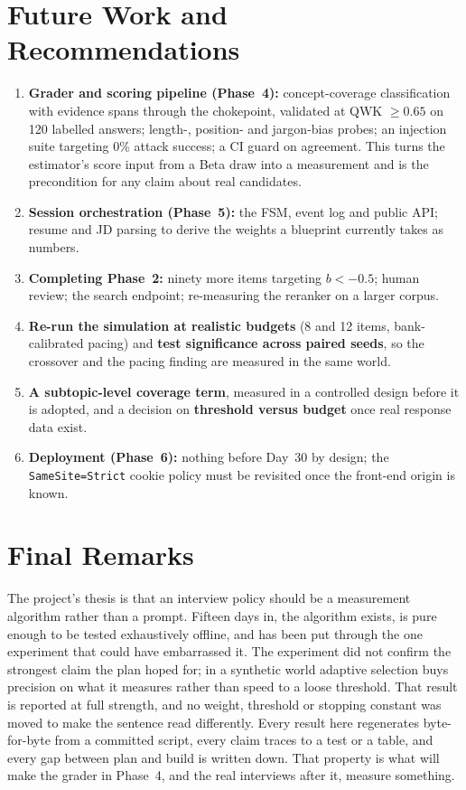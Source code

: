 \documentclass{tietreport}
\begin{document}
\section{Future Work and Recommendations}
\label{sec:future}

\begin{enumerate}
  \item \textbf{Grader and scoring pipeline (Phase~4):} concept-coverage classification with
    evidence spans through the chokepoint, validated at QWK $\ge0.65$ on 120 labelled answers;
    length-, position- and jargon-bias probes; an injection suite targeting 0\% attack success;
    a CI guard on agreement. This turns the estimator's score input from a Beta draw into a
    measurement and is the precondition for any claim about real candidates.
  \item \textbf{Session orchestration (Phase~5):} the FSM, event log and public API; resume and
    JD parsing to derive the weights a blueprint currently takes as numbers.
  \item \textbf{Completing Phase~2:} ninety more items targeting $b<-0.5$; human review; the
    search endpoint; re-measuring the reranker on a larger corpus.
  \item \textbf{Re-run the simulation at realistic budgets} (8 and 12 items, bank-calibrated
    pacing) and \textbf{test significance across paired seeds}, so the crossover and the pacing
    finding are measured in the same world.
  \item \textbf{A subtopic-level coverage term}, measured in a controlled design before it is
    adopted, and a decision on \textbf{threshold versus budget} once real response data exist.
  \item \textbf{Deployment (Phase~6):} nothing before Day~30 by design; the
    \texttt{SameSite=Strict} cookie policy must be revisited once the front-end origin is known.
\end{enumerate}

\section{Final Remarks}

The project's thesis is that an interview policy should be a measurement algorithm rather than
a prompt. Fifteen days in, the algorithm exists, is pure enough to be tested exhaustively
offline, and has been put through the one experiment that could have embarrassed it. The
experiment did not confirm the strongest claim the plan hoped for; in a synthetic world adaptive
selection buys precision on what it measures rather than speed to a loose threshold. That
result is reported at full strength, and no weight, threshold or stopping constant was moved to
make the sentence read differently. Every result here regenerates byte-for-byte from a committed
script, every claim traces to a test or a table, and every gap between plan and build is written
down. That property is what will make the grader in Phase~4, and the real interviews after it,
measure something.
\end{document}

